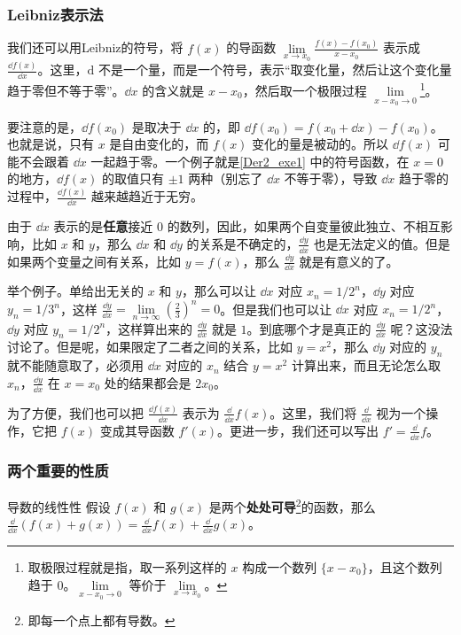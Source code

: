 \subsubsection{Leibniz表示法}


我们还可以用Leibniz的符号，将 $f(x)$ 的导函数 $\lim\limits_{x\to x_0}\frac{f(x)-f(x_0)}{x-x_0}$ 表示成 $\frac{\dd f(x)}{\dd x}$。这里，$\mathrm{d}$ 不是一个量，而是一个符号，表示“取变化量，然后让这个变化量趋于零但不等于零”。$\dd x$ 的含义就是 $x-x_0$，然后取一个极限过程 $\lim\limits_{x-x_0\to 0}$\footnote{取极限过程就是指，取一系列这样的 $x$ 构成一个数列 $\{x-x_0\}$，且这个数列趋于 $0$。$\lim\limits_{x-x_0\to 0}$ 等价于 $\lim\limits_{x\to x_0}$。}。

要注意的是，$\dd f(x_0)$ 是取决于 $\dd x$ 的，即 $\dd f(x_0)=f(x_0+\dd x)-f(x_0)$。也就是说，只有 $x$ 是自由变化的，而 $f(x)$ 变化的量是被动的。所以 $\dd f(x)$ 可能不会跟着 $\dd x$ 一起趋于零。一个例子就是\autoref{Der2_exe1} 中的符号函数，在 $x=0$ 的地方，$\dd f(x)$ 的取值只有 $\pm 1$ 两种（别忘了 $\dd x$ 不等于零），导致 $\dd x$ 趋于零的过程中，$\frac{\dd f(x)}{\dd x}$ 越来越趋近于无穷。


由于 $\dd x$ 表示的是\textbf{任意}接近 $0$ 的数列，因此，如果两个自变量彼此独立、不相互影响，比如 $x$ 和 $y$，那么 $\dd x$ 和 $\dd y$ 的关系是不确定的，$\frac{\dd y}{\dd x}$ 也是无法定义的值。但是如果两个变量之间有关系，比如 $y=f(x)$，那么 $\frac{\dd y}{\dd x}$ 就是有意义的了。

举个例子。单给出无关的 $x$ 和 $y$，那么可以让 $\dd x$ 对应 $x_n=1/2^n$，$\dd y$ 对应 $y_n=1/3^n$，这样 $\frac{\dd y}{\dd x}=\lim\limits_{n\to\infty}(\frac{2}{3})^n=0$。但是我们也可以让 $\dd x$ 对应 $x_n=1/2^n$，$\dd y$ 对应 $y_n=1/2^n$，这样算出来的 $\frac{\dd y}{\dd x}$ 就是 $1$。到底哪个才是真正的 $\frac{\dd y}{\dd x}$ 呢？这没法讨论了。但是呢，如果限定了二者之间的关系，比如 $y=x^2$，那么 $\dd y$ 对应的 $y_n$ 就不能随意取了，必须用 $\dd x$ 对应的 $x_n$ 结合 $y=x^2$ 计算出来，而且无论怎么取 $x_n$，$\frac{\dd y}{\dd x}$ 在 $x=x_0$ 处的结果都会是 $2x_0$。

为了方便，我们也可以把 $\frac{\dd f(x)}{\dd x}$ 表示为 $\frac{\dd}{\dd x}f(x)$。这里，我们将 $\frac{\dd}{\dd x}$ 视为一个操作，它把 $f(x)$ 变成其导函数 $f'(x)$。更进一步，我们还可以写出 $f'=\frac{\dd}{\dd x}f$。


\subsubsection{两个重要的性质}

\begin{theorem}{导数的线性性}\label{Der2_the2}
假设 $f(x)$ 和 $g(x)$ 是两个\textbf{处处可导}\footnote{即每一个点上都有导数。}的函数，那么 $\frac{\dd}{\dd x}(f(x)+g(x))=\frac{\dd}{\dd x}f(x)+\frac{\dd}{\dd x}g(x)$。
\end{theorem}

